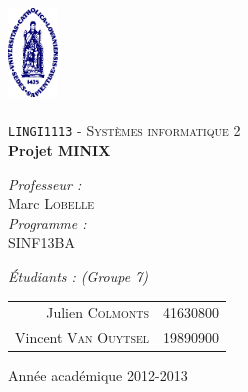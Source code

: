 \begin{titlepage}
 
\begin{center}
 
\vspace*{-2cm}\includegraphics[width=0.10\textwidth]{ucl.png}\\[1cm]
 
\textsc{\LARGE }\\[1.5cm]
 
\textsc{\Large \texttt{LINGI1113} - Systèmes informatique 2}\\[0.5cm]
 
 
\vspace{1.0cm}
{ \huge \bfseries Projet MINIX\vspace{0.8cm}\\}
 
\vspace{1.0cm}
 
\begin{minipage}{0.4\textwidth}
\begin{flushleft} \large
\emph{Professeur :}\\
	Marc \textsc{Lobelle}\\
\vspace{1cm}
\emph{Programme :}\\
	SINF13BA
\end{flushleft}
\end{minipage}
\begin{minipage}{0.4\textwidth}
\begin{flushright} \large
\emph{Étudiants : (Groupe 7)} \\
\begin{tabular}{rl}
	Julien \textsc{Colmonts}	& {\footnotesize 41630800}\\
	Vincent \textsc{Van Ouytsel}	& {\footnotesize 19890900}
\end{tabular}
\end{flushright}
\end{minipage}
 
\vfill
 
\vspace{1.1cm}
{\large Année académique 2012-2013}
\vspace{-1cm} 
\end{center}
 
\end{titlepage}
